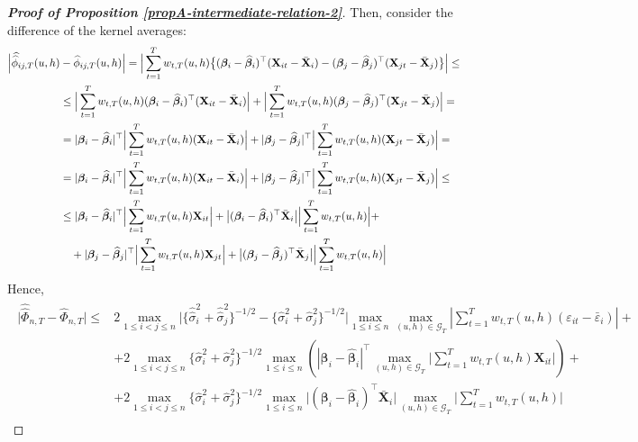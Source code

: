 \documentclass[a4paper,12pt]{article}
\newcommand{\doublehat}[1]{\skew{5.5}\widehat{\widehat{#1}}}
\newcommand{\doublehattwo}[1]{\widehat{\widehat{#1}}}
\begin{document}
\begin{proof}[\textnormal{\textbf{Proof of Proposition \ref{propA-intermediate-relation-2}}}]
Then, consider the difference of the kernel averages:
\begin{align*}
\Big| \doublehat{\phi}_{ij, T}(u,h) &- \widehat{\phi}_{ij, T}(u,h) \Big|  =\Big| \sum_{t=1}^T w_{t,T}(u,h) \big\{ (\bm{\beta}_i - \widehat{\bm{\beta}}_i)^\top (\mathbf{X}_{it} - \bar{\mathbf{X}}_{i}) - (\bm{\beta}_j - \widehat{\bm{\beta}}_j)^\top (\mathbf{X}_{jt} - \bar{\mathbf{X}}_{j}) \big\} \Big| \le \\
&\le \Big| \sum_{t=1}^T w_{t,T}(u,h) (\bm{\beta}_i - \widehat{\bm{\beta}}_i)^\top (\mathbf{X}_{it} - \bar{\mathbf{X}}_{i}) \Big| +  \Big| \sum_{t=1}^T w_{t,T}(u,h)(\bm{\beta}_j - \widehat{\bm{\beta}}_j)^\top (\mathbf{X}_{jt} - \bar{\mathbf{X}}_{j})  \Big| =\\
&= |\bm{\beta}_i - \widehat{\bm{\beta}}_i|^\top \Big| \sum_{t=1}^T w_{t,T}(u,h)  (\mathbf{X}_{it} - \bar{\mathbf{X}}_{i}) \Big| + |\bm{\beta}_j - \widehat{\bm{\beta}}_j|^\top \Big| \sum_{t=1}^T w_{t,T}(u,h) (\mathbf{X}_{jt} - \bar{\mathbf{X}}_{j})  \Big| =\\
&= |\bm{\beta}_i - \widehat{\bm{\beta}}_i|^\top \Big| \sum_{t=1}^T w_{t,T}(u,h)  (\mathbf{X}_{it} - \bar{\mathbf{X}}_{i}) \Big| + |\bm{\beta}_j - \widehat{\bm{\beta}}_j|^\top \Big| \sum_{t=1}^T w_{t,T}(u,h) (\mathbf{X}_{jt} - \bar{\mathbf{X}}_{j})  \Big| \leq\\
&\leq |\bm{\beta}_i - \widehat{\bm{\beta}}_i|^\top \Big| \sum_{t=1}^T w_{t,T}(u,h) \mathbf{X}_{it} \Big| +  \big|(\bm{\beta}_i - \widehat{\bm{\beta}}_i)^\top\bar{\mathbf{X}}_{i}\big| \Big| \sum_{t=1}^T w_{t,T}(u,h)  \Big| +\\
&\quad +|\bm{\beta}_j - \widehat{\bm{\beta}}_j|^\top \Big| \sum_{t=1}^T w_{t,T}(u,h) \mathbf{X}_{jt}  \Big| + \big|(\bm{\beta}_j - \widehat{\bm{\beta}}_j)^\top\bar{\mathbf{X}}_{j}\big| \Big| \sum_{t=1}^T w_{t,T}(u,h)  \Big| 
 \end{align*}
Hence,
\begin{align}\label{ineq-diff-1}
\begin{split}
\big| \doublehattwo{\Phi}_{n, T} - \widehat{\Phi}_{n, T} \big| \le  & 2\max_{1 \le i < j \le n} \big|\{\doublehattwo{\sigma}_i^2 + \doublehattwo{\sigma}_j^2 \}^{-1/2} - \{\widehat{\sigma}_i^2 + \widehat{\sigma}_j^2 \}^{-1/2}\big|\max_{1 \le i \le n} \max_{(u,h) \in \mathcal{G}_T}\left| \sum_{t=1}^T w_{t,T}(u,h) (\varepsilon_{it} - \bar{\varepsilon}_i) \right| + \\
&+ 2\max_{1\le i < j \le n} \{\widehat{\sigma}_i^2+ \widehat{\sigma}_j^2 \}^{-1/2} \max_{1 \le i \le n}\left(|\bm{\beta}_i - \widehat{\bm{\beta}}_i|^\top \max_{(u,h) \in \mathcal{G}_T} \Big| \sum_{t=1}^T w_{t,T}(u,h) \mathbf{X}_{it} \Big|\right) + \\
&+ 2\max_{1\le i < j \le n} \{\widehat{\sigma}_i^2+ \widehat{\sigma}_j^2 \}^{-1/2}\max_{1 \le i \le n}\big|(\bm{\beta}_i - \widehat{\bm{\beta}}_i)^\top\bar{\mathbf{X}}_{i}\big| \max_{(u,h) \in \mathcal{G}_T}  \Big| \sum_{t=1}^T w_{t,T}(u,h)  \Big|
\end{split}
\end{align}


\end{proof}
\end{document}
